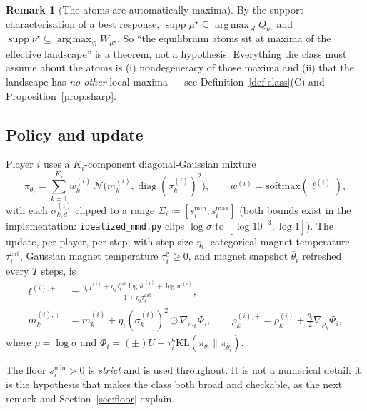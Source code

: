 \documentclass[11pt]{article}
\theoremstyle{definition}
\newtheorem{remark}{Remark}
\newcommand{\cA}{\mathcal{A}}
\newcommand{\cB}{\mathcal{B}}
\newcommand{\cN}{\mathcal{N}}
\newcommand{\KL}{\mathrm{KL}}
\DeclareMathOperator*{\argmax}{arg\,max}
\DeclareMathOperator{\supp}{supp}
\begin{document}
\begin{remark}[The atoms are automatically maxima]\label{rem:support}
By the support characterisation of a best response,
$\supp\mu^\star \subseteq \argmax_{\cA} Q_{\nu^\star}$ and
$\supp\nu^\star \subseteq \argmax_{\cB} W_{\mu^\star}$. So ``the equilibrium
atoms sit at maxima of the effective landscape'' is a theorem, not a hypothesis.
Everything the class must assume about the atoms is (i) nondegeneracy of those
maxima and (ii) that the landscape has \emph{no other} local maxima --- see
Definition~\ref{def:class}(C) and Proposition~\ref{prop:sharp}.
\end{remark}

\subsection{Policy and update}

Player $i$ uses a $K_i$-component diagonal-Gaussian mixture
\begin{equation}
  \pi_{\theta_i} = \sum_{k=1}^{K_i} w^{(i)}_k\,
  \cN\!\big(m^{(i)}_k, \operatorname{diag}(\sigma^{(i)}_k)^2\big),
  \qquad w^{(i)} = \mathrm{softmax}(\ell^{(i)}),
\end{equation}
with each $\sigma^{(i)}_{k,d}$ clipped to a range
$\Sigma_i \coloneqq [s^{\min}_i, s^{\max}_i]$ (both bounds exist in the
implementation: \texttt{idealized\_mmd.py} clips $\log\sigma$ to
$[\log 10^{-3}, \log 1]$). The update, per player, per step, with step size
$\eta_i$, categorical magnet temperature $\tau_i^{\mathrm{cat}}$, Gaussian magnet
temperature $\tau_i^{\mathrm{g}} \ge 0$, and magnet snapshot $\bar\theta_i$
refreshed every $T$ steps, is
\begin{align}
  \ell^{(i),+} &= \frac{\eta_i q^{(i)} + \eta_i \tau^{\mathrm{cat}}_i
    \log \bar w^{(i)} + \log w^{(i)}}{1 + \eta_i \tau^{\mathrm{cat}}_i},
  \label{eq:cat}\\
  m^{(i),+}_k &= m^{(i)}_k + \eta_i (\sigma^{(i)}_k)^2 \odot
    \nabla_{m_k} \Phi_i, \qquad
  \rho^{(i),+}_k = \rho^{(i)}_k + \tfrac{\eta_i}{2} \nabla_{\rho_k} \Phi_i,
  \label{eq:gauss}
\end{align}
where $\rho = \log\sigma$ and
$\Phi_i = (\pm)U - \tau^{\mathrm{g}}_i \KL(\pi_{\theta_i} \| \pi_{\bar\theta_i})$.

The floor $s^{\min}_i > 0$ is \emph{strict} and is used throughout. It is not a
numerical detail: it is the hypothesis that makes the class both broad and
checkable, as the next remark and Section~\ref{sec:floor} explain.
\end{document}
